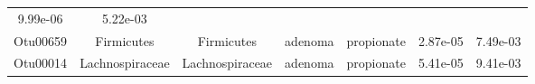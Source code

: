 \documentclass[11pt,]{article}
\begin{document}
\begin{longtable}[]{@{}ccccccc@{}}
\begin{minipage}[t]{0.09\columnwidth}
9.99e-06\strut
\end{minipage} & \begin{minipage}[t]{0.09\columnwidth}\centering\strut
5.22e-03\strut
\end{minipage}\tabularnewline
\begin{minipage}[t]{0.09\columnwidth}\centering\strut
Otu00659\strut
\end{minipage} & \begin{minipage}[t]{0.17\columnwidth}\centering\strut
Firmicutes\strut
\end{minipage} & \begin{minipage}[t]{0.17\columnwidth}\centering\strut
Firmicutes\strut
\end{minipage} & \begin{minipage}[t]{0.09\columnwidth}\centering\strut
adenoma\strut
\end{minipage} & \begin{minipage}[t]{0.11\columnwidth}\centering\strut
propionate\strut
\end{minipage} & \begin{minipage}[t]{0.09\columnwidth}\centering\strut
2.87e-05\strut
\end{minipage} & \begin{minipage}[t]{0.09\columnwidth}\centering\strut
7.49e-03\strut
\end{minipage}\tabularnewline
\begin{minipage}[t]{0.09\columnwidth}\centering\strut
Otu00014\strut
\end{minipage} & \begin{minipage}[t]{0.17\columnwidth}\centering\strut
Lachnospiraceae\strut
\end{minipage} & \begin{minipage}[t]{0.17\columnwidth}\centering\strut
Lachnospiraceae\strut
\end{minipage} & \begin{minipage}[t]{0.09\columnwidth}\centering\strut
adenoma\strut
\end{minipage} & \begin{minipage}[t]{0.11\columnwidth}\centering\strut
propionate\strut
\end{minipage} & \begin{minipage}[t]{0.09\columnwidth}\centering\strut
5.41e-05\strut
\end{minipage} & \begin{minipage}[t]{0.09\columnwidth}\centering\strut
9.41e-03\strut
\end{minipage}\tabularnewline

\end{longtable}
\end{document}
